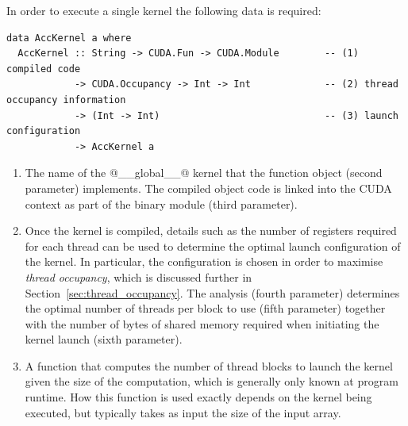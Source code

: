 In order to execute a single kernel the following data is required:
%
\begin{lstlisting}[style=haskell]
data AccKernel a where
  AccKernel :: String -> CUDA.Fun -> CUDA.Module        -- (1) compiled code
            -> CUDA.Occupancy -> Int -> Int             -- (2) thread occupancy information
            -> (Int -> Int)                             -- (3) launch configuration
            -> AccKernel a
\end{lstlisting}
%
\begin{enumerate}
\item The name of the @__global__@ kernel that the
    function object (second parameter) implements. The compiled object code is
    linked into the CUDA context as part of the binary module (third parameter).

\item Once the kernel is compiled, details such as the number of registers
    required for each thread can be used to determine the optimal launch
    configuration of the kernel. In particular, the configuration is chosen in
    order to maximise \emph{thread occupancy}, which is
    discussed further in Section~\ref{sec:thread_occupancy}.
    The analysis (fourth parameter) determines the optimal number of threads per
    block to use (fifth parameter) together with the number of bytes of shared
    memory required when initiating the kernel launch (sixth parameter).

\item A function that computes the number of thread blocks
    to launch the kernel given the size of the computation, which is generally
    only known at program runtime. How this function is used exactly depends on
    the kernel being executed, but typically takes as input the size of the
    input array.
\end{enumerate}

